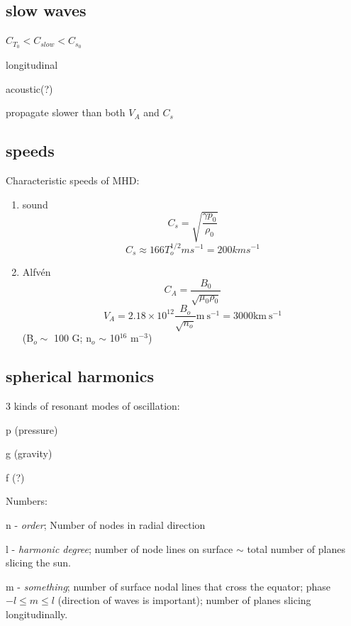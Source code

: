\documentclass[12pt]{article}
\begin{document}
\subsection*{slow waves}
\begin{itemize*}
    \item $C_{T_0} < C_{slow} < C_{s_0}$
    \item longitudinal
    \item acoustic(?)
    \item propagate slower than both $V_A$ and $C_s$
\end{itemize*}

\subsection*{speeds}
Characteristic speeds of MHD:
\begin{enumerate}
    \item sound
        $$ C_s = \sqrt{\frac{\gamma p_0}{\rho_0}} $$
        $$ C_s \approx 166 T_o^{1/2} m s^{-1} = 200 km s^{-1}$$
    \item Alfv\'en
        $$ C_A = \frac{B_0}{\sqrt{\mu_0\rho_0}} $$
        $$ V_A = 2.18\times10^{12}\frac{B_o}{\sqrt{n_o}}
        \textrm{m}\ \textrm{s}^{-1}
               = 3000 \textrm{km}\ \textrm{s}^{-1} $$
               (B$_o \sim$ 100 G; n$_o$ $\sim$ 10$^{16}$ m$^{-3}$)
\end{enumerate}

\subsection*{spherical harmonics}
3 kinds of resonant modes of oscillation:
\begin{itemize*}
    \item p (pressure)
    \item g (gravity)
    \item f (?)
\end{itemize*}
Numbers:
\begin{itemize*}
    \item n - \emph{order}; Number of nodes in radial direction
    \item l - \emph{harmonic degree}; number of node lines on
        surface $\sim$ total number of planes slicing the sun.
    \item m - \emph{something}; number of surface nodal lines that
        cross the equator; phase\\
        $-l \leq m \leq l$ (direction of waves is important); number of
        planes slicing longitudinally.
\end{itemize*}
\end{document}
